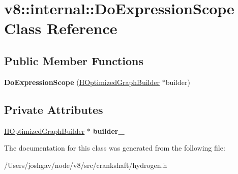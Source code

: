\hypertarget{classv8_1_1internal_1_1_do_expression_scope}{}\section{v8\+:\+:internal\+:\+:Do\+Expression\+Scope Class Reference}
\label{classv8_1_1internal_1_1_do_expression_scope}
\subsection*{Public Member Functions}
\begin{DoxyCompactItemize}
\item 
{\bfseries Do\+Expression\+Scope} (\hyperlink{classv8_1_1internal_1_1_h_optimized_graph_builder}{H\+Optimized\+Graph\+Builder} $\ast$builder)\hypertarget{classv8_1_1internal_1_1_do_expression_scope_ab3b41d0a91336375ec061069960d0f9d}{}\label{classv8_1_1internal_1_1_do_expression_scope_ab3b41d0a91336375ec061069960d0f9d}

\end{DoxyCompactItemize}
\subsection*{Private Attributes}
\begin{DoxyCompactItemize}
\item 
\hyperlink{classv8_1_1internal_1_1_h_optimized_graph_builder}{H\+Optimized\+Graph\+Builder} $\ast$ {\bfseries builder\+\_\+}\hypertarget{classv8_1_1internal_1_1_do_expression_scope_abdcaec2f6261eee2bc01db3e63731a8d}{}\label{classv8_1_1internal_1_1_do_expression_scope_abdcaec2f6261eee2bc01db3e63731a8d}

\end{DoxyCompactItemize}


The documentation for this class was generated from the following file\+:\begin{DoxyCompactItemize}
\item 
/\+Users/joshgav/node/v8/src/crankshaft/hydrogen.\+h\end{DoxyCompactItemize}
